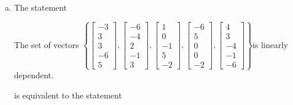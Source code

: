 \begin{exerciseAnswer}
\begin{enumerate}[(a)]
\item The statement 
\begin{center}\begin{minipage}{0.8\textwidth}
 The set of vectors \( \left\{ \left[\begin{array}{c}
-3 \\
3 \\
3 \\
-6 \\
5
\end{array}\right] , \left[\begin{array}{c}
-6 \\
-4 \\
2 \\
-1 \\
3
\end{array}\right] , \left[\begin{array}{c}
1 \\
0 \\
-1 \\
5 \\
-2
\end{array}\right] , \left[\begin{array}{c}
-6 \\
5 \\
0 \\
0 \\
-2
\end{array}\right] , \left[\begin{array}{c}
4 \\
3 \\
-4 \\
-1 \\
-6
\end{array}\right] \right\} \)is linearly dependent.
\end{minipage}\end{center}
     is equivalent to the statement 
\begin{center}\begin{minipage}{0.8\textwidth}
 The vector equation \( x_{1} \left[\begin{array}{c}
-3 \\
3 \\
3 \\
-6 \\
5
\end{array}\right] + x_{2} \left[\begin{array}{c}
-6 \\
-4 \\

\end{array}
\end{minipage}
\end{center}
\end{enumerate}
\end{exerciseAnswer}
